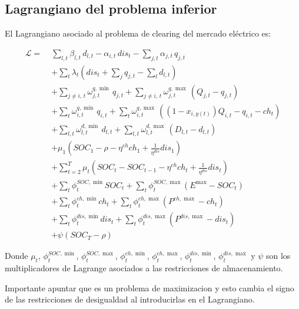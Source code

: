 \documentclass[a4paper,11pt]{article}
\begin{document}
\clearpage
\subsection{Lagrangiano del problema inferior}

El Lagrangiano asociado al problema de clearing del mercado eléctrico es:

\begin{align}
\mathcal{L} =\;
& \sum_{l,t} \beta_{l,t}\, d_{l,t}
- \alpha_{i,t}\, dis_t
- \sum_{j,t} \alpha_{j,t}\, q_{j,t} \\
& + \sum_{t} \lambda_t \left( dis_t + \sum_{j} q_{j,t} - \sum_{l} d_{l,t} \right) \\
& + \sum_{j \neq i,\, t} \omega^{q,\min}_{j,t}\, q_{j,t}
+ \sum_{j \neq i,\, t} \omega^{q,\max}_{j,t}\, (Q_{j,t} - q_{j,t}) \\
& + \sum_{t} \omega^{q,\min}_{i,t}\, q_{i,t}
+ \sum_{t} \omega^{q,\max}_{i,t}\, \left( (1-x_{i,y(t)}) Q_{i,t} - q_{i,t} - ch_t \right) \\
& + \sum_{l,t} \omega^{d,\min}_{l,t}\, d_{l,t}
+ \sum_{l,t} \omega^{d,\max}_{l,t}\, (D_{l,t} - d_{l,t}) \\
& + \mu_1 (SOC_1 - \rho - \eta^{ch} ch_1 + \frac{1}{\eta^{dis}} dis_1) \\
& + \sum_{t=2}^T \mu_t (SOC_t - SOC_{t-1} - \eta^{ch} ch_t + \frac{1}{\eta^{dis}} dis_t) \\
& + \sum_{t} \phi_t^{SOC,\min} SOC_t + \sum_{t} \phi_t^{SOC,\max} (E^{\max} - SOC_t) \\
& + \sum_{t} \phi_t^{ch,\min} ch_t + \sum_{t} \phi_t^{ch,\max} (P^{ch,\max} - ch_t) \\
& + \sum_{t} \phi_t^{dis,\min} dis_t + \sum_{t} \phi_t^{dis,\max} (P^{dis,\max} - dis_t) \\
& + \psi (SOC_T - \rho)
\end{align}

Donde $\mu_t$, $\phi_t^{SOC,\min}$, $\phi_t^{SOC,\max}$, $\phi_t^{ch,\min}$, $\phi_t^{ch,\max}$, $\phi_t^{dis,\min}$, $\phi_t^{dis,\max}$ y $\psi$ son los multiplicadores de Lagrange asociados a las restricciones de almacenamiento.

Importante apuntar que es un problema de maximizacion y esto cambia el signo de las restricciones de desigualdad al introducirlas en el Lagrangiano.
\end{document}
